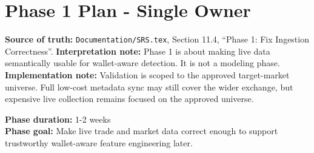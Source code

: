 \documentclass{article}
\begin{document}
\section*{Phase 1 Plan - Single Owner}

\textbf{Source of truth:} \texttt{Documentation/SRS.tex}, Section 11.4, ``Phase 1: Fix Ingestion Correctness''.
\textbf{Interpretation note:} Phase 1 is about making live data semantically usable for wallet-aware detection. It is not a modeling phase.
\textbf{Implementation note:} Validation is scoped to the approved target-market universe. Full low-cost metadata sync may still cover the wider exchange, but expensive live collection remains focused on the approved universe.

\textbf{Phase duration:} 1-2 weeks\\
\textbf{Phase goal:} Make live trade and market data correct enough to support trustworthy wallet-aware feature engineering later.
\end{document}
